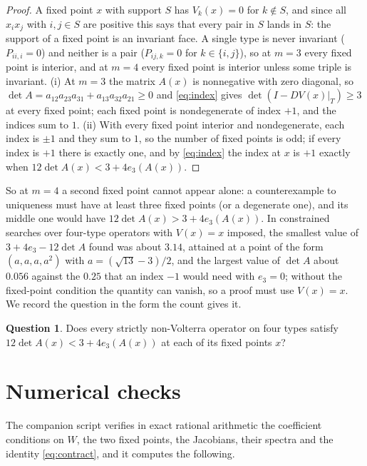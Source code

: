 \documentclass[11pt]{amsart}
\theoremstyle{definition}
\newtheorem{question}[theorem]{Question}
\begin{document}
\begin{proof}
A fixed point $x$ with support $S$ has $V_k(x)=0$ for $k\notin S$, and since all $x_ix_j$ with $i,j\in S$ are positive this says that every pair in $S$ lands in $S$: the support of a fixed point is an invariant face. A single type is never invariant ($P_{ii,i}=0$) and neither is a pair ($P_{ij,k}=0$ for $k\in\{i,j\}$), so at $m=3$ every fixed point is interior, and at $m=4$ every fixed point is interior unless some triple is invariant. (i) At $m=3$ the matrix $A(x)$ is nonnegative with zero diagonal, so $\det A=a_{12}a_{23}a_{31}+a_{13}a_{32}a_{21}\ge0$ and \eqref{eq:index} gives $\det(I-DV(x)|_T)\ge3$ at every fixed point; each fixed point is nondegenerate of index $+1$, and the indices sum to $1$. (ii) With every fixed point interior and nondegenerate, each index is $\pm1$ and they sum to $1$, so the number of fixed points is odd; if every index is $+1$ there is exactly one, and by \eqref{eq:index} the index at $x$ is $+1$ exactly when $12\det A(x)<3+4e_3(A(x))$.
\end{proof}

So at $m=4$ a second fixed point cannot appear alone: a counterexample to uniqueness must have at least three fixed points (or a degenerate one), and its middle one would have $12\det A(x)>3+4e_3(A(x))$. In constrained searches over four-type operators with $V(x)=x$ imposed, the smallest value of $3+4e_3-12\det A$ found was about $3.14$, attained at a point of the form $(a,a,a,a^2)$ with $a=(\sqrt{13}-3)/2$, and the largest value of $\det A$ about $0.056$ against the $0.25$ that an index $-1$ would need with $e_3=0$; without the fixed-point condition the quantity can vanish, so a proof must use $V(x)=x$. We record the question in the form the count gives it.

\begin{question}\label{q:det}
Does every strictly non-Volterra operator on four types satisfy $12\det A(x)<3+4e_3(A(x))$ at each of its fixed points $x$?
\end{question}

\section{Numerical checks}\label{sec:numerics}

The companion script verifies in exact rational arithmetic the coefficient conditions on $W$, the two fixed points, the Jacobians, their spectra and the identity \eqref{eq:contract}, and it computes the following.
\end{document}
